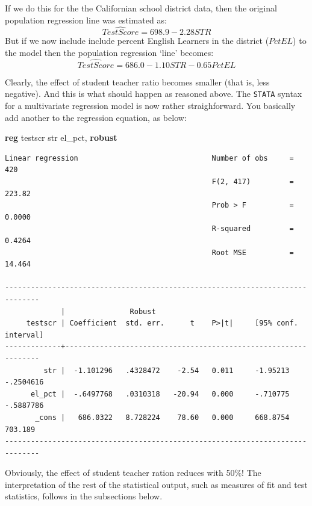 \documentclass[
]{book}
\newenvironment{Shaded}{\begin{snugshade}}{\end{snugshade}}
\newcommand{\KeywordTok}[1]{\textcolor[rgb]{0.13,0.29,0.53}{\textbf{#1}}}
\newcommand{\NormalTok}[1]{#1}
\begin{document}
If we do this for the the Californian school district data, then the original population regression line was estimated as:
\begin{equation}
\widehat{TestScore} = 698.9- 2.28 STR
\end{equation}
But if we now include include percent English Learners in the district (\(PctEL\)) to the model then the population regression `line' becomes:
\begin{equation}
\widehat{TestScore} = 686.0- 1.10 STR - 0.65  PctEL
\end{equation}

Clearly, the effect of student teacher ratio becomes smaller (that is, less negative). And this is what should happen as reasoned above. The \texttt{STATA} syntax for a multivariate regression model is now rather straighforward. You basically add another to the regression equation, as below:

\begin{Shaded}
\begin{Highlighting}[]
\KeywordTok{reg}\NormalTok{ testscr str el\_pct, }\KeywordTok{robust}
\end{Highlighting}
\end{Shaded}

\begin{verbatim}
Linear regression                               Number of obs     =        420
                                                F(2, 417)         =     223.82
                                                Prob > F          =     0.0000
                                                R-squared         =     0.4264
                                                Root MSE          =     14.464

------------------------------------------------------------------------------
             |               Robust
     testscr | Coefficient  std. err.      t    P>|t|     [95% conf. interval]
-------------+----------------------------------------------------------------
         str |  -1.101296   .4328472    -2.54   0.011     -1.95213   -.2504616
      el_pct |  -.6497768   .0310318   -20.94   0.000     -.710775   -.5887786
       _cons |   686.0322   8.728224    78.60   0.000     668.8754     703.189
------------------------------------------------------------------------------
\end{verbatim}

Obviously, the effect of student teacher ration reduces with 50\%! The interpretation of the rest of the statistical output, such as measures of fit and test statistics, follows in the subsections below.
\end{document}
